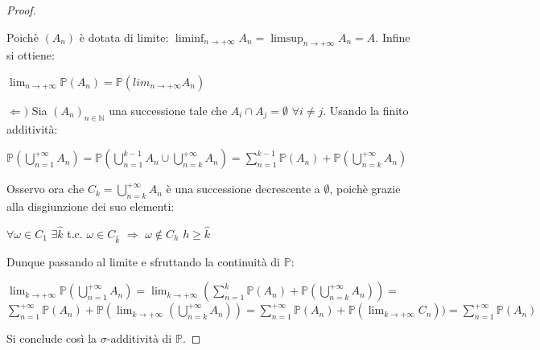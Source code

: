 \begin{theorem}
\begin{proof}
\begin{enumerate}
\begin{center}
\end{center}
Poichè $(A_n)$ è dotata di limite: $\liminf_{n\to +\infty}A_n=\limsup_{n\to +\infty}A_n=A$.
Infine si ottiene:
\begin{center}
    $\lim_{n\to +\infty}\mathbb{P}(A_n)=\mathbb{P}(lim_{n\to +\infty}A_n)$
\end{center}
\end{enumerate}
$\Leftarrow)$ Sia $(A_n)_{n\in\mathbb{N}}$ una successione tale che $A_i\cap A_j=\emptyset$ $\forall i\neq j$. Usando la finito additività:
\begin{center}
    $\mathbb{P}(\bigcup\limits_{n=1}^{+\infty}A_n)=\mathbb{P}(\bigcup\limits_{n=1}^{k-1}A_n\cup\bigcup\limits_{n=k}^{+\infty}A_n)=\sum\limits_{n=1}^{k-1}\mathbb{P}(A_n) + \mathbb{P}(\bigcup\limits_{n=k}^{+\infty}A_n)$
\end{center}
Osservo ora che $C_k=\bigcup\limits_{n=k}^{+\infty}A_n$ è una successione decrescente a $\emptyset$, poichè grazie alla disgiunzione dei suo elementi:
\begin{center}
    $\forall\omega\in C_1$ $\exists\hat{k}$ t.c. $\omega\in C_{\hat{k}}$ $\Rightarrow$ $\omega\notin C_h$ $h\geq\hat{k}$
\end{center}
Dunque passando al limite e sfruttando la continuità di $\mathbb{P}$:
\begin{center}
    $\lim_{k\to+\infty}\mathbb{P}(\bigcup\limits_{n=1}^{+\infty}A_n)=\lim_{k\to+\infty}(\sum\limits_{n=1}^{k}\mathbb{P}(A_n) + \mathbb{P}(\bigcup\limits_{n=k}^{+\infty}A_n))=$
    \vspace{7px}
    \newline
    $\sum\limits_{n=1}^{+\infty}\mathbb{P}(A_n) + \mathbb{P}(\lim_{k\to+\infty}(\bigcup\limits_{n=k}^{+\infty}A_n))=\sum\limits_{n=1}^{+\infty}\mathbb{P}(A_n) + \mathbb{P}(\lim_{k\to+\infty}C_n))=\sum\limits_{n=1}^{+\infty}\mathbb{P}(A_n)$
\end{center}
Si conclude così la $\sigma$-additività di $\mathbb{P}$.
\end{proof}
\end{theorem}